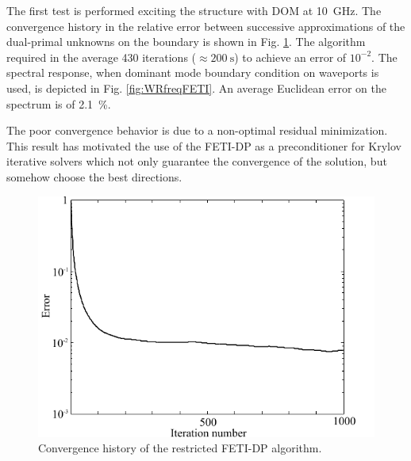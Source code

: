 The first test is performed exciting the structure with DOM at 10~GHz. The convergence history in the relative error between successive approximations of the dual-primal unknowns on the boundary is shown in Fig. \ref{fig:Convergence}. The algorithm required in the average 430 iterations ($\approx 200~\mathrm{s}$) to achieve an error of $10^{-2}$. The spectral response, when dominant mode boundary condition on waveports is used, is depicted in Fig. \ref{fig:WRfreqFETI}. An average Euclidean error on the spectrum is of 2.1~\%.

The poor convergence behavior is due to a non-optimal residual minimization. This result has motivated the use of the FETI-DP as a preconditioner for Krylov iterative solvers which not only guarantee the convergence of the solution, but somehow choose the best directions.


\begin{figure}[ht!]
\centering
\includegraphics[width=13.4cm]{Convergence}
\caption{Convergence history of the restricted FETI-DP algorithm.}
\label{fig:Convergence}
\end{figure}

